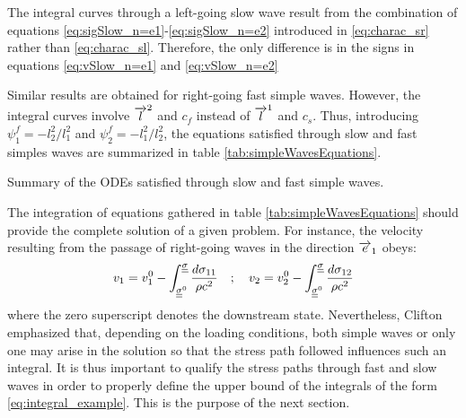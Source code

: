 \begin{remark}
  The integral curves through a left-going slow wave result from the combination of equations \eqref{eq:sigSlow_n=e1}-\eqref{eq:sigSlow_n=e2} introduced in \eqref{eq:charac_sr} rather than \eqref{eq:charac_sl}.
  Therefore, the only difference is in the signs in equations \eqref{eq:vSlow_n=e1} and \eqref{eq:vSlow_n=e2}
\end{remark}

Similar results are obtained for right-going fast simple waves.
However, the integral curves involve ${\overrightarrow{l}}^2$ and $c_f$ instead of ${\overrightarrow{l}}^1$ and $c_s$. 
Thus, introducing $\psi^f_1=-l_2^2/l_1^2$ and $\psi^f_2=-l_1^2/l_2^2$, the equations satisfied through slow and fast simples waves are summarized in table \ref{tab:simpleWavesEquations}.
\begin{table}[h!]
  \centering
  
  \caption{Summary of the ODEs satisfied through slow and fast simple waves.}
  \label{tab:simpleWavesEquations}
\end{table}

The integration of equations gathered in table \ref{tab:simpleWavesEquations} should provide the complete solution of a given problem.
For instance, the velocity resulting from the passage of right-going waves in the direction ${\overrightarrow{e}}_1$ obeys:
\begin{equation}
  \label{eq:integral_example}
  v_1 = v_1^0 - \int_{{\underline{\underline{\sigma}}}^0}^{{\underline{\underline{\sigma}}}} \frac{d \sigma_{11}}{\rho c^2} \quad ;\quad v_2 = v_2^0 - \int_{{\underline{\underline{\sigma}}}^0}^{{\underline{\underline{\sigma}}}} \frac{d \sigma_{12}}{\rho c^2}
\end{equation}
where the zero superscript denotes the downstream state.
Nevertheless, Clifton \cite{Clifton} emphasized that, depending on the loading conditions, both simple waves or only one may arise in the solution so that the stress path followed influences such an integral.
It is thus important to qualify the stress paths through fast and slow waves in order to properly define the upper bound of the integrals of the form \eqref{eq:integral_example}.
This is the purpose of the next section.



